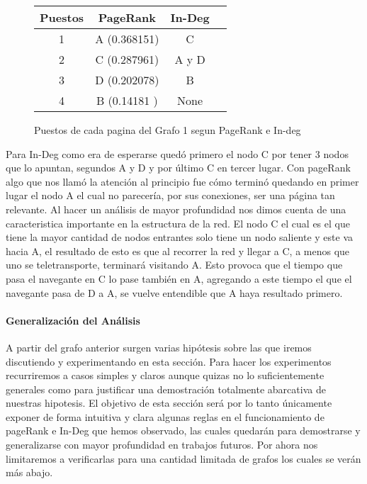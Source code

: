 \begin{figure}[H]
\centering
\begin{tabular}{| c | c | c | c |}
  \hline
  Puestos & PageRank & In-Deg \\ \hline \hline
  1 & A (0.368151) & C \\ \hline
  2 & C (0.287961) & A y D \\ \hline
  3 & D (0.202078) & B\\ \hline
  4 & B (0.14181 ) & None \\ \hline
\end{tabular}

  \caption{\footnotesize{Puestos de cada pagina del Grafo 1 segun PageRank e In-deg}}
  \label{fig:Rankings}
\end{figure}

Para In-Deg como era de esperarse quedó primero el nodo C por tener 3 nodos que lo apuntan, segundos A y D y por último C en tercer lugar. Con pageRank algo que nos llamó la atención al principio fue cómo terminó quedando en primer lugar el nodo A el cual no parecería, por sus conexiones, ser una página tan relevante. Al hacer un análisis de mayor profundidad nos dimos cuenta de una caracteristica importante en la estructura de la red. El nodo C el cual es el que tiene la mayor cantidad de nodos entrantes solo tiene un nodo saliente y este va hacia A, el resultado de esto es que al recorrer la red y llegar a C, a menos que uno se teletransporte, terminará visitando A. Esto provoca que el tiempo que pasa el navegante en C lo pase también en A, agregando a este tiempo el que el navegante pasa de D a A, se vuelve entendible que A haya resultado primero.

\paragraph{Generalización del Análisis}

A partir del grafo anterior surgen varias hipótesis sobre las que iremos discutiendo y experimentando en esta sección. Para hacer los experimentos recurriremos a casos simples y claros aunque quizas no lo suficientemente generales como para justificar una demostración totalmente abarcativa de nuestras hipotesis. El objetivo de esta sección será por lo tanto únicamente exponer de forma intuitiva y clara algunas reglas en el funcionamiento de pageRank e In-Deg que hemos observado, las cuales quedarán para demostrarse y generalizarse con mayor profundidad en trabajos futuros. Por ahora nos limitaremos a verificarlas para una cantidad limitada de grafos los cuales se verán más abajo.

